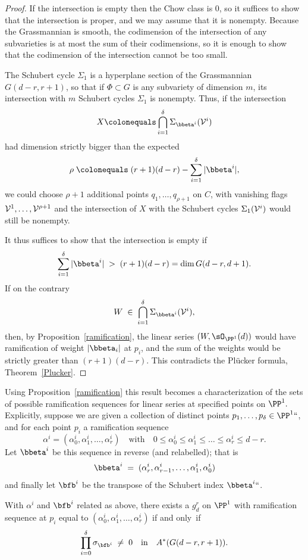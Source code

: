 \begin{proof}
If the intersection is empty then the Chow class is 0, so it suffices
to show that the intersection is proper,
and we may assume that it is nonempty. Because the Grassmannian is smooth,
the codimension of the intersection of any subvarieties
 is at most the sum of their codimensions, so it is enough to show that
 the codimension of the
 intersection cannot be too small.

The Schubert cycle $\Sigma_1$ is a hyperplane section of the Grassmannian
$G(d-r, r+1)$, so that if $\Phi \subset G$ is any subvariety of
dimension $m$, its intersection with $m$ Schubert cycles $\Sigma_1$
is nonempty. Thus, if the intersection
$$
X \colonequals  \bigcap_{i=1}^\delta \Sigma_{{\bbeta}^i}({\cal V}^i)
$$
had dimension strictly bigger than the expected
$$
\rho \; \colonequals  \; (r+1)(d-r) - \sum_{i=1}^\delta |{\bbeta}^i|,
$$
we could choose $\rho + 1$ additional points $q_1,\dots,q_{\rho + 1}$
on $C$, with vanishing flags ${\cal V}^1, \dots, {\cal V}^{\rho + 1}$
and the intersection of $X$ with the Schubert cycles $\Sigma_1({\cal
V}^i)$ would still be nonempty.

It thus suffices to show that the intersection is empty if
$$
\sum_{i=1}^\delta |{\bbeta}^i| \; > \; (r+1)(d-r) = \dim G(d-r, d+1).
$$
If on the contrary
$$
W \; \in \; \bigcap_{i=1}^\delta \Sigma_{{\bbeta}^i}({\cal V}^i),
$$
then, by Proposition~\ref{ramification}, the linear series $(W,
\sO_{\PP^{1}}(d))$  would have
ramification of weight $|{\bbeta_i}|$ at $p_i$, and the sum of the
weights would be strictly greater than $(r+1)(d-r)$.
This contradicts the Pl\"ucker formula, Theorem~\ref{Plucker}.
\end{proof}

Using Proposition~\ref{ramification} this result becomes a
characterization of the sets of possible ramification
sequences for linear series at specified points on $\PP^1.$
 Explicitly, suppose we are given a collection of distinct points
 $p_1,\dots,p_\delta \in \PP^1` `$, and for each point $p_i$ a
 ramification sequence
$$
\alpha^i = (\alpha^i_0, \alpha^i_1, \dots, \alpha^i_r) \quad \text{with}
\quad 0 \leq \alpha^i_0 \leq \alpha^i_1 \leq \dots \leq \alpha^i_r
\leq d-r.
$$
Let ${\bbeta}^i$ be this sequence in reverse (and relabelled); that is
$$
{\bbeta}^i \; = \; (\alpha^i_r, \alpha^i_{r-1}, \dots, \alpha^i_1,
\alpha^i_0)
$$
and finally let $\bfb^i$ be the transpose of the Schubert index
${\bbeta}^i` `$.

\begin{corollary}
With $\alpha^i $ and $\bfb^i$ related as above,  there exists a
$g^r_d$ on $\PP^1$ with ramification sequence at $p_i$ equal to
$(\alpha^i_0, \alpha^i_1, \dots, \alpha^i_r)$ if and only~if
$$
\prod_{i=0}^\delta  \sigma_{\bfb^i} \; \neq \; 0 \quad \text{in} \quad
A^*(G(d-r, r+1)).
$$
\end{corollary}

